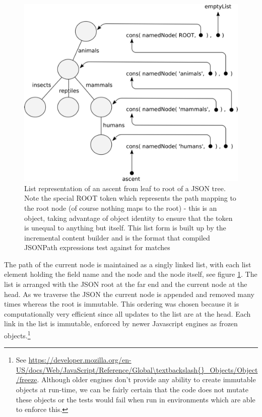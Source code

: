 \documentclass[]{article}
\makeatletter
\def\maxwidth{\ifdim\Gin@nat@width>\linewidth\linewidth
\else\Gin@nat@width\fi}
\let\Oldincludegraphics\includegraphics
\renewcommand{\includegraphics}[1]{\Oldincludegraphics[width=\maxwidth]{#1}}
\makeatother
\begin{document}
\begin{figure}[htbp]
\centering
\includegraphics{images/ascent.png}
\caption{List representation of an ascent from leaf to root of a JSON
tree. Note the special ROOT token which represents the path mapping to
the root node (of course nothing maps to the root) - this is an object,
taking advantage of object identity to ensure that the token is unequal
to anything but itself. This list form is built up by the incremental
content builder and is the format that compiled JSONPath expressions
test against for matches \label{ascent}}
\end{figure}

The path of the current node is maintained as a singly linked list, with
each list element holding the field name and the node and the node
itself, see figure \ref{ascent}. The list is arranged with the JSON root
at the far end and the current node at the head. As we traverse the JSON
the current node is appended and removed many times whereas the root is
immutable. This ordering was chosen because it is computationally very
efficient since all updates to the list are at the head. Each link in
the list is immutable, enforced by newer Javascript engines as frozen
objects.\footnote{See
  \url{https://developer.mozilla.org/en-US/docs/Web/JavaScript/Reference/Global\textbackslash{}_Objects/Object/freeze}.
  Although older engines don't provide any ability to create immutable
  objects at run-time, we can be fairly certain that the code does not
  mutate these objects or the tests would fail when run in environments
  which are able to enforce this.}
\end{document}
